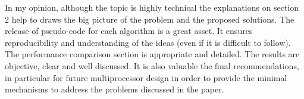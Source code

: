 \documentclass[a4paper,10pt]{scrartcl}
\begin{document}
In my opinion, although the topic is highly technical the explanations on section 2 help to draws the big picture of the problem and the proposed solutions.  The release of pseudo-code for each algorithm is a great asset.  It ensures reproducibility and understanding of the ideas (even if it is difficult to follow).  The performance comparison section is appropriate and detailed.  The results are objective, clear and well discussed.  It is also valuable the final recommendations, in particular for future multiprocessor design in order to provide the minimal mechanisms to address the problems discussed in the paper.

\end{document}
